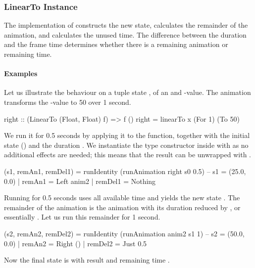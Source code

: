 \subsubsection{LinearTo Instance}

The  implementation of  constructs
the new state, calculates the remainder of the animation, and calculates
the unused time. The difference between the  duration and the
frame time determines whether there is a remaining  animation or
remaining time.

\paragraph{Examples}

Let us illustrate the behaviour on a tuple state , of an  and -value.
The  animation transforms the -value to 50 over 1 second.

\begin{code}
right :: (LinearTo (Float, Float) f) => f ()
right = linearTo x (For 1) (To 50)
\end{code}

We run it for 0.5 seconds by applying it to the  function,
together with the initial state () and the duration . We instantiate the  type constructor
inside  with  as no additional effects are
needed; this means that the result can be unwrapped with
.

\begin{code}
(s1, remAn1, remDel1) = runIdentity (runAnimation right s0 0.5)
-- s1 = (25.0, 0.0) | remAn1 = Left anim2 | remDel1 = Nothing
\end{code}

Running  for 0.5 seconds uses all available time and yields the new state
. The remainder of
the animation is the  animation with its duration reduced by , or essentially . Let us run this
remainder for 1 second.

\begin{code}
(s2, remAn2, remDel2) = runIdentity (runAnimation anim2 s1 1)
-- s2 = (50.0, 0.0) | remAn2 = Right () | remDel2 = Just 0.5
\end{code}

Now the final state is  with result \hs{()} and remaining time .

